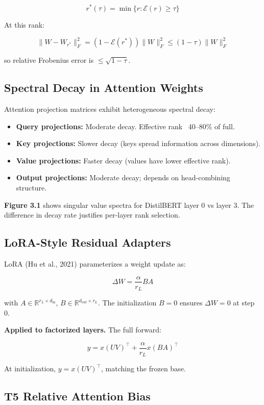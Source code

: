 \[
r^*(\tau) = \min\{r : \mathcal{E}(r) \geq \tau\}
\tag{3.5}
\]

At this rank:

\[
\|W - W_{r^*}\|_F^2 = (1 - \mathcal{E}(r^*)) \|W\|_F^2 \leq (1 - \tau) \|W\|_F^2
\tag{3.6}
\]

so relative Frobenius error is $\leq \sqrt{1 - \tau}$.

\subsection{Spectral Decay in Attention Weights}

Attention projection matrices exhibit heterogeneous spectral decay:

\begin{itemize}
\item \textbf{Query projections:} Moderate decay. Effective rank ~40--80\% of full.
\item \textbf{Key projections:} Slower decay (keys spread information across dimensions).
\item \textbf{Value projections:} Faster decay (values have lower effective rank).
\item \textbf{Output projections:} Moderate decay; depends on head-combining structure.

\end{itemize}
\textbf{Figure 3.1} shows singular value spectra for DistilBERT layer 0 vs layer 3. 
The difference in decay rate justifies per-layer rank selection.

\subsection{LoRA-Style Residual Adapters}

LoRA (Hu et al., 2021) parameterizes a weight update as:

\[
\Delta W = \frac{\alpha}{r_L} B A
\tag{3.7}
\]

with $A \in \mathbb{R}^{r_L \times d_\text{in}}$, $B \in \mathbb{R}^{d_\text{out} \times r_L}$. 
The initialization $B = 0$ ensures $\Delta W = 0$ at step 0.

\textbf{Applied to factorized layers.} The full forward:

\[
y = x (U V)^\top + \frac{\alpha}{r_L} x (B A)^\top
\tag{3.8}
\]

At initialization, $y = x (U V)^\top$, matching the frozen base.

\subsection{T5 Relative Attention Bias}

